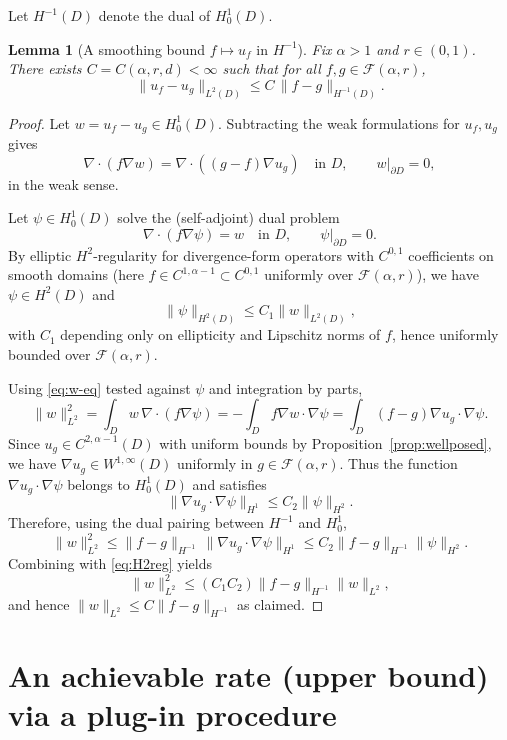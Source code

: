 \documentclass[11pt]{article}
\newtheorem{lemma}{Lemma}
\newcommand{\D}{D}
\begin{document}
Let $H^{-1}(\D)$ denote the dual of $H^1_0(\D)$.

\begin{lemma}[A smoothing bound $f\mapsto u_f$ in $H^{-1}$]\label{lem:forwardHminus1}
Fix $\alpha>1$ and $r\in(0,1)$. There exists $C=C(\alpha,r,d)<\infty$ such that for all $f,g\in\mathcal F(\alpha,r)$,
\[
\|u_f-u_g\|_{L^2(\D)} \le C\, \|f-g\|_{H^{-1}(\D)}.
\]
\end{lemma}

\begin{proof}
Let $w=u_f-u_g\in H^1_0(\D)$. Subtracting the weak formulations for $u_f,u_g$ gives
\begin{equation}\label{eq:w-eq}
\nabla\cdot(f\nabla w)=\nabla\cdot((g-f)\nabla u_g)\quad\text{in }\D,\qquad w|_{\partial\D}=0,
\end{equation}
in the weak sense.

Let $\psi\in H^1_0(\D)$ solve the (self-adjoint) dual problem
\[
\nabla\cdot(f\nabla \psi)=w\quad\text{in }\D,\qquad \psi|_{\partial\D}=0.
\]
By elliptic $H^2$-regularity for divergence-form operators with $C^{0,1}$ coefficients on smooth domains (here $f\in C^{1,\alpha-1}\subset C^{0,1}$ uniformly over $\mathcal F(\alpha,r)$), we have $\psi\in H^2(\D)$ and
\begin{equation}\label{eq:H2reg}
\|\psi\|_{H^2(\D)}\le C_1\|w\|_{L^2(\D)},
\end{equation}
with $C_1$ depending only on ellipticity and Lipschitz norms of $f$, hence uniformly bounded over $\mathcal F(\alpha,r)$.

Using \eqref{eq:w-eq} tested against $\psi$ and integration by parts,
\[
\|w\|_{L^2}^2 = \int_\D w\,\nabla\cdot(f\nabla\psi)
= -\int_\D f\nabla w\cdot \nabla\psi
= \int_\D (f-g)\nabla u_g\cdot \nabla\psi.
\]
Since $u_g\in C^{2,\alpha-1}(\D)$ with uniform bounds by Proposition~\ref{prop:wellposed}, we have $\nabla u_g\in W^{1,\infty}(\D)$ uniformly in $g\in\mathcal F(\alpha,r)$.
Thus the function $\nabla u_g\cdot \nabla\psi$ belongs to $H^1_0(\D)$ and satisfies
\[
\|\nabla u_g\cdot\nabla\psi\|_{H^1}\le C_2\|\psi\|_{H^2}.
\]
Therefore, using the dual pairing between $H^{-1}$ and $H^1_0$,
\[
\|w\|_{L^2}^2 \le \|f-g\|_{H^{-1}}\, \|\nabla u_g\cdot\nabla\psi\|_{H^1}
\le C_2 \|f-g\|_{H^{-1}} \|\psi\|_{H^2}.
\]
Combining with \eqref{eq:H2reg} yields
\[
\|w\|_{L^2}^2 \le (C_1C_2)\|f-g\|_{H^{-1}}\|w\|_{L^2},
\]
and hence $\|w\|_{L^2}\le C\|f-g\|_{H^{-1}}$ as claimed.
\end{proof}

\section{An achievable rate (upper bound) via a plug-in procedure}
\end{document}
